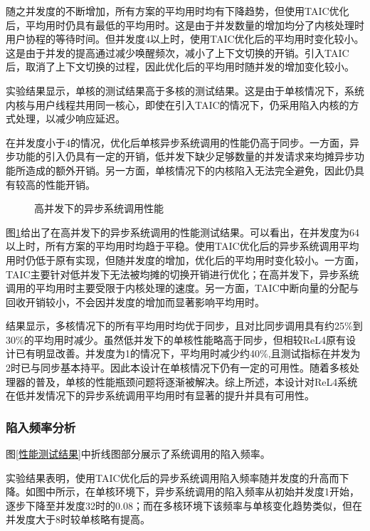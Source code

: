 随之并发度的不断增加，所有方案的平均用时均有下降趋势，但使用TAIC优化后，平均用时仍具有最低的平均用时。这是由于并发数量的增加均分了内核处理时用户协程的等待时间。但并发度4以上时，使用TAIC优化后的平均用时变化较小。这是由于并发的提高通过减少唤醒频次，减小了上下文切换的开销。引入TAIC后，取消了上下文切换的过程，因此优化后的平均用时随并发的增加变化较小。

实验结果显示，单核的测试结果高于多核的测试结果。这是由于单核情况下，系统内核与用户线程共用同一核心，即使在引入TAIC的情况下，仍采用陷入内核的方式处理，以减少响应延迟。

在并发度小于4的情况，优化后单核异步系统调用的性能仍高于同步。一方面，异步功能的引入仍具有一定的开销，低并发下缺少足够数量的并发请求来均摊异步功能所造成的额外开销。另一方面，单核情况下的内核陷入无法完全避免，因此仍具有较高的性能开销。

\begin{figure}[htbp]
  \centering
  
  \caption{高并发下的异步系统调用性能}\label{性能测试结果2}
\end{figure}

图\ref{性能测试结果2}给出了在高并发下的异步系统调用的性能测试结果。可以看出，在并发度为64以上时，所有方案的平均用时均趋于平稳。使用TAIC优化后的异步系统调用平均用时仍低于原有实现，但随并发度的增加，优化后的平均用时变化较小。一方面，TAIC主要针对低并发下无法被均摊的切换开销进行优化；在高并发下，异步系统调用的平均用时主要受限于内核处理的速度。另一方面，TAIC中断向量的分配与回收开销较小，不会因并发度的增加而显著影响平均用时。

结果显示，多核情况下的所有平均用时均优于同步，且对比同步调用具有约25\%到30\%的平均用时减少。虽然低并发下的单核性能略高于同步，但相较ReL4原有设计已有明显改善。并发度为1的情况下，平均用时减少约40\%,且测试指标在并发为2时已与同步基本持平。因此本设计在单核情况下仍有一定的可用性。随着多核处理器的普及，单核的性能瓶颈问题将逐渐被解决。综上所述，本设计对ReL4系统在低并发情况下的异步系统调用平均用时有显著的提升并具有可用性。

\subsubsection{陷入频率分析}

图\ref{性能测试结果}中折线图部分展示了系统调用的陷入频率。

实验结果表明，使用TAIC优化后的异步系统调用陷入频率随并发度的升高而下降。如图中所示，在单核环境下，异步系统调用的陷入频率从初始并发度1开始，逐步下降至并发度32时的0.08；而在多核环境下该频率与单核变化趋势类似，但在并发度大于8时较单核略有提高。

